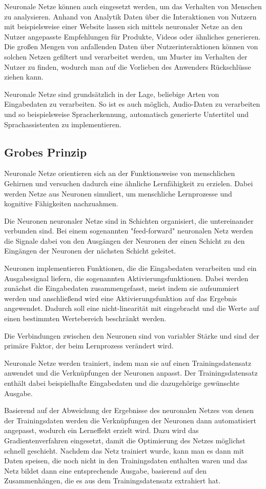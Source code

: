 \bigbreak\noindent
Neuronale Netze können auch eingesetzt werden, um das Verhalten von Menschen zu analysieren. Anhand von Analytik Daten über die Interaktionen von Nutzern mit beispielsweise einer Website lassen sich mittels neuronaler Netze an den Nutzer angepasste Empfehlungen für Produkte, Videos oder ähnliches generieren.
Die großen Mengen von anfallenden Daten über Nutzerinteraktionen können von solchen Netzen gefiltert und verarbeitet werden, um Muster im Verhalten der Nutzer zu finden, wodurch man auf die Vorlieben des Anwenders Rückschlüsse ziehen kann.

\bigbreak\noindent
Neuronale Netze sind grundsätzlich in der Lage, beliebige Arten von Eingabedaten zu verarbeiten.
So ist es auch möglich, Audio-Daten zu verarbeiten und so beispielsweise Spracherkennung, automatisch generierte Untertitel und Sprachassistenten zu implementieren.

\subsection{Grobes Prinzip}\label{subsec:einleitung_nn_grobes:prinzip}
Neuronale Netze orientieren sich an der Funktionsweise von menschlichen Gehirnen und versuchen dadurch eine ähnliche Lernfähigkeit zu erzielen.
Dabei werden Netze aus Neuronen simuliert, um menschliche Lernprozesse und kognitive Fähigkeiten nachzuahmen. 

\bigbreak\noindent
Die Neuronen neuronaler Netze sind in Schichten organisiert, die untereinander verbunden sind.
Bei einem sogenannten "feed-forward" neuronalen Netz werden die Signale dabei von den Ausgängen der Neuronen der einen Schicht zu den Eingängen der Neuronen der nächsten Schicht geleitet.

\bigbreak\noindent
Neuronen implementieren Funktionen, die die Eingabedaten verarbeiten und ein Ausgabesignal liefern, die sogenannten Aktivierungsfunktionen.
Dabei werden zunächst die Eingabedaten zusammengefasst, meist indem sie aufsummiert werden und anschließend wird eine Aktivierungsfunktion auf das Ergebnis angewendet. Dadurch soll eine nicht-linearität mit eingebracht und die Werte auf einen bestimmten Wertebereich beschränkt werden.

\bigbreak\noindent
Die Verbindungen zwischen den Neuronen sind von variabler Stärke und sind der primäre Faktor, der beim Lernprozess verändert wird.

\bigbreak\noindent
Neuronale Netze werden trainiert, indem man sie auf einen Trainingsdatensatz anwendet und die Verknüpfungen der Neuronen anpasst.
Der Trainingsdatensatz enthält dabei beispielhafte Eingabedaten und die dazugehörige gewünschte Ausgabe.

\bigbreak\noindent
Basierend auf der Abweichung der Ergebnisse des neuronalen Netzes von denen der Trainingsdaten werden die Verknüpfungen der Neuronen dann automatisiert angepasst, wodurch ein Lerneffekt erzielt wird.
Dazu wird das Gradientenverfahren eingesetzt, damit die Optimierung des Netzes möglichst schnell geschieht.
Nachdem das Netz trainiert wurde, kann man es dann mit Daten speisen, die noch nicht in den Trainingsdaten enthalten waren und das Netz bildet dann eine entsprechende Ausgabe, basierend auf den Zusammenhängen, die es aus dem Trainingsdatensatz extrahiert hat.